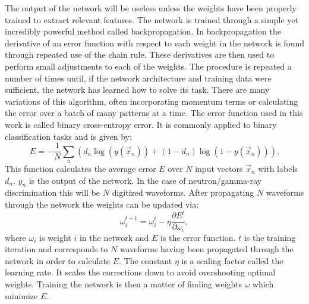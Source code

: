 \documentclass[main.tex]{subfiles}
\begin{document}
The output of the network will be useless unless the weights have been properly trained to extract relevant features. The network is trained through a simple yet incredibly powerful method called backpropagation. In backpropagation the derivative of an error function with respect to each weight in the network is found through repeated use of the chain rule. These derivatives are then used to perform small adjustments to each of the weights. The procedure is repeated a number of times until, if the network architecture and training data were sufficient, the network has learned how to solve its task. There are many variations of this algorithm, often incorporating momentum terms or calculating the error over a batch of many patterns at a time.
The error function used in this work is called binary cross-entropy error. It is commonly applied to binary classification tasks and is given by:
\begin{equation}
	E = -\frac{1}{N}\sum_n\left(	d_n\log(y(\vec x_n))+(1-d_n)\log(1-y(\vec x_n))	\right).
\end{equation}
This function calculates the average error $E$ over $N$ input vectors $\vec x_n$ with labels $d_n$. $y_n$ is the output of the network. In the case of neutron/gamma-ray discrimination this will be $N$ digitized waveforms. After propagating $N$ waveforms through the network the weights can be updated via:
\begin{equation}
	\omega^{t+1}_i = \omega^{t}_i - \eta\frac{\partial E^t}{\partial \omega_i},
\end{equation}
where $\omega_i$ is weight $i$ in the network and $E$ is the error function. $t$ is the training iteration and corresponds to $N$ waveforms having been propagated through the network in order to calculate $E$. The constant $\eta$ is a scaling factor called the learning rate. It scales the corrections down to avoid overshooting optimal weights. Training the network is then a matter of finding weights $\omega$ which minimize $E$.
\end{document}
